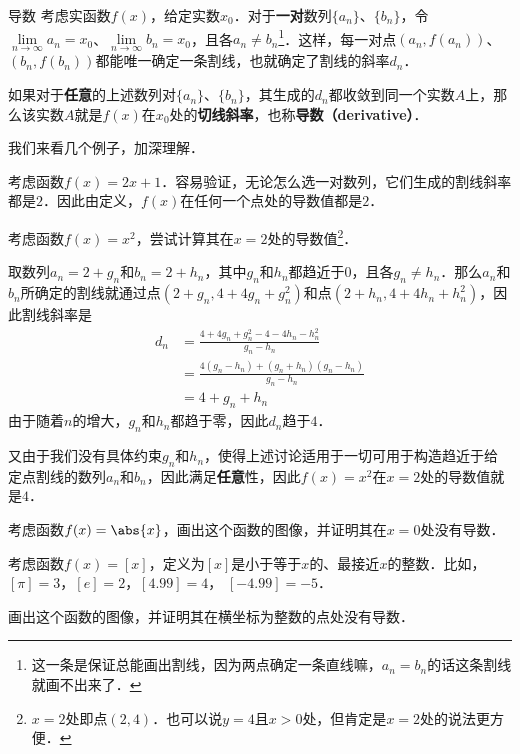 \begin{definition}{导数}
考虑实函数$f(x)$，给定实数$x_0$．对于\textbf{一对}数列$\{a_n\}$、$\{b_n\}$，令$\lim\limits_{n\to\infty}a_n=x_0$、$\lim\limits_{n\to\infty}b_n=x_0$，且各$a_n\not=b_n$\footnote{这一条是保证总能画出割线，因为两点确定一条直线嘛，$a_n=b_n$的话这条割线就画不出来了．}．这样，每一对点$(a_n, f(a_n))$、$ (b_n, f(b_n))$都能唯一确定一条割线，也就确定了割线的斜率$d_n$．

如果对于\textbf{任意}的上述数列对$\{a_n\}$、$\{b_n\}$，其生成的$d_n$都收敛到同一个实数$A$上，那么该实数$A$就是$f(x)$在$x_0$处的\textbf{切线斜率}，也称\textbf{导数（derivative）}．
\end{definition}

我们来看几个例子，加深理解．

\begin{example}{}
考虑函数$f(x)=2x+1$．容易验证，无论怎么选一对数列，它们生成的割线斜率都是$2$．因此由定义，$f(x)$在任何一个点处的导数值都是$2$．
\end{example}

\begin{example}{}\label{Der_ex1}
考虑函数$f(x)=x^2$，尝试计算其在$x=2$处的导数值\footnote{$x=2$处即点$(2, 4)$．也可以说$y=4$且$x>0$处，但肯定是$x=2$处的说法更方便．}．

取数列$a_n=2+g_n$和$b_n=2+h_n$，其中$g_n$和$h_n$都趋近于$0$，且各$g_n\not=h_n$．那么$a_n$和$b_n$所确定的割线就通过点$(2+g_n, 4+4g_n+g_n^2)$和点$(2+h_n, 4+4h_n+h_n^2)$，因此割线斜率是
\begin{equation}
\begin{aligned}
d_n&=\frac{4+4g_n+g_n^2-4-4h_n-h_n^2}{g_n-h_n}\\
&=\frac{4(g_n-h_n)+(g_n+h_n)(g_n-h_n)}{g_n-h_n}\\
&=4+g_n+h_n
\end{aligned}
\end{equation}
由于随着$n$的增大，$g_n$和$h_n$都趋于零，因此$d_n$趋于$4$．

又由于我们没有具体约束$g_n$和$h_n$，使得上述讨论适用于一切可用于构造趋近于给定点割线的数列$a_n$和$b_n$，因此满足\textbf{任意}性，因此$f(x)=x^2$在$x=2$处的导数值就是$4$．
\end{example}

\begin{exercise}{}
考虑函数$f(x)=\abs{x}$，画出这个函数的图像，并证明其在$x=0$处没有导数．
\end{exercise}

\begin{exercise}{}
考虑函数$f(x)=[x]$，定义为$[x]$是小于等于$x$的、最接近$x$的整数．比如，$[\pi]=3$，$[e]=2$，$[4.99]=4$， $[-4.99]=-5$．

画出这个函数的图像，并证明其在横坐标为整数的点处没有导数．
\end{exercise}








